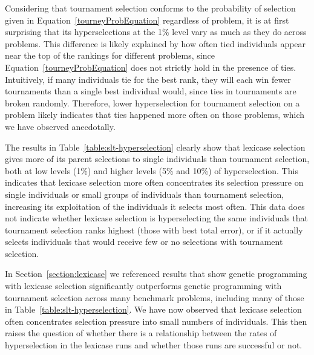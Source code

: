 \documentclass{sig-alternate}
\begin{document}
%

Considering that tournament selection conforms to the probability of selection given in Equation~\ref{tourneyProbEquation} regardless of problem, it is at first surprising that its hyperselections at the 1\% level vary as much as they do across problems. This difference is likely explained by how often tied individuals appear near the top of the rankings for different problems, since Equation~\ref{tourneyProbEquation} does not strictly hold in the presence of ties. Intuitively, if many individuals tie for the best rank, they will each win fewer tournaments than a single best individual would, since ties in tournaments are broken randomly. Therefore, lower hyperselection for tournament selection on a problem likely indicates that ties happened more often on those problems, which we have observed anecdotally.


The results in Table~\ref{table:slt-hyperselection} clearly show that lexicase selection gives more of its parent selections to single individuals than tournament selection, both at low levels (1\%) and higher levels (5\% and 10\%) of hyperselection. This indicates that lexicase selection more often concentrates its selection pressure on single individuals or small groups of individuals than tournament selection, increasing its exploitation of the individuals it selects most often. This data does not indicate whether lexicase selection is hyperselecting the same individuals that tournament selection ranks highest (those with best total error), or if it actually selects individuals that would receive few or no selections with tournament selection.

In Section~\ref{section:lexicase} we referenced results that show genetic programming with lexicase selection significantly outperforms genetic programming with tournament selection across many benchmark problems, including many of those in Table~\ref{table:slt-hyperselection}. We have now observed that lexicase selection often concentrates selection pressure into small numbers of individuals. This then raises the question of whether there is a relationship between the rates of hyperselection in the lexicase runs and whether those runs are successful or not.
\end{document}
